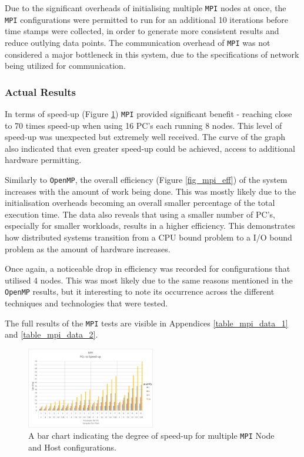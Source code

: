 \documentclass[journal,transmag]{IEEEtran}
\begin{document}
			Due to the significant overheads of initialising multiple \texttt{MPI} nodes at once, the \texttt{MPI} configurations were permitted to run for an additional 10 iterations before time stamps were collected, in order to generate more consistent results and reduce outlying data points. The communication overhead of \texttt{MPI} was not considered a major bottleneck in this system, due to the specifications of network being utilized for communication.
			
		\subsubsection{Actual Results}
			In terms of speed-up (Figure \ref{fig_mpi_speed}) \texttt{MPI} provided significant benefit - reaching close to 70 times speed-up when using 16 PC's each running 8 nodes. This level of speed-up was unexpected but extremely well received. The curve of the graph also indicated that even greater speed-up could be achieved, access to additional hardware permitting.
		
			Similarly to \texttt{OpenMP}, the overall efficiency (Figure \ref{fig_mpi_eff}) of the system increases with the amount of work being done. This was mostly likely due to the initialisation overheads becoming an overall smaller percentage of the total execution time. 
			The data also reveals that using a smaller number of PC's, especially for smaller workloads, results in a higher efficiency. This demonstrates how distributed systems transition from a CPU bound problem to a I/O bound problem as the amount of hardware increases.
			
			Once again, a noticeable drop in efficiency was recorded for configurations that utilised 4 nodes. This was most likely due to the same reasons mentioned in the \texttt{OpenMP} results, but it interesting to note its occurrence across the different techniques and technologies that were tested.
			
			The full results of the \texttt{MPI} tests are visible in Appendices \ref{table_mpi_data_1} and \ref{table_mpi_data_2}.
		
		\begin{figure}[h]
			\centering
			\includegraphics[width = 0.5\textwidth]{chartMPISpeed}
			\caption{A bar chart indicating the degree of speed-up for multiple \texttt{MPI} Node and Host configurations.}
			\label{fig_mpi_speed}
		\end{figure}
		
\end{document}
